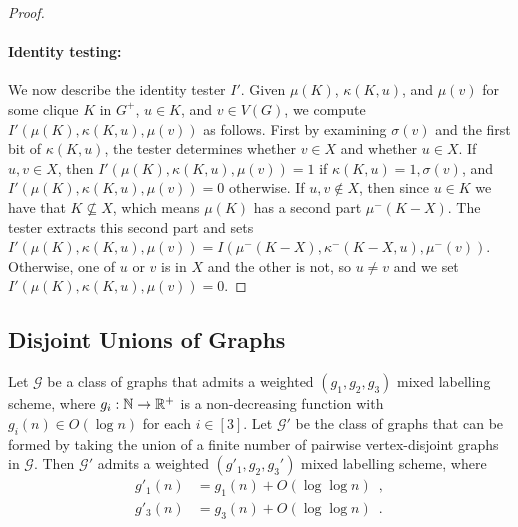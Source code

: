 \documentclass{patmorin}
\newcommand{\Oh}{O}
\begin{document}
\begin{proof}
  \paragraph{Identity testing:}
  We now describe the identity tester $I'$.
  Given $\mu(K)$, $\kappa(K,u)$, and $\mu(v)$ for some clique $K$ in $G^+$, $u\in K$, and $v\in V(G)$,
  we compute $I'(\mu(K),\kappa(K,u),\mu(v))$ as follows.
  First by examining $\sigma(v)$ and the first bit of $\kappa(K,u)$, the tester determines whether $v\in X$ and whether $u\in X$.
  If $u,v\in X$, then $I'(\mu(K),\kappa(K,u),\mu(v))=1$ if $\kappa(K,u)=1,\sigma(v)$, and $I'(\mu(K),\kappa(K,u),\mu(v))=0$ otherwise.
  If $u,v\not\in X$, then since $u\in K$ we have that $K\not\subseteq X$, which means $\mu(K)$ has a second part $\mu^-(K-X)$. The tester extracts this second part and sets
  $I'(\mu(K),\kappa(K,u),\mu(v)) = I(\mu^-(K-X),\kappa^-(K-X,u),\mu^-(v))$.
  Otherwise, one of $u$ or $v$ is in $X$ and the other is not, so $u\neq v$ and we set $I'(\mu(K),\kappa(K,u),\mu(v)) =0$.
  \qedhere
\end{proof}

\subsection{Disjoint Unions of Graphs}
\label{sec:disjoint}

\begin{lem}\label{disjoint_union_ii}
  Let $\mathcal{G}$ be a class of graphs that admits a weighted $(g_1,g_2,g_3)$ mixed labelling scheme, where $g_i:\mathbb{N}\to\mathbb{R}^+$ is a non-decreasing function  with $g_i(n)\in \Oh(\log n)$ for each $i\in[3]$. Let $\mathcal{G}'$ be the class of graphs that can be formed by taking the union of a finite number of pairwise vertex-disjoint graphs in $\mathcal{G}$.
  Then $\mathcal{G}'$ admits a weighted $(g'_1,g_2,g_3')$ mixed labelling scheme, where
  \begin{align*}
    g'_1(n)
     & = g_1(n)+\Oh(\log\log n)\enspace,   \\
    g'_3(n)
     & = g_3(n)+\Oh(\log\log n) \enspace .
  \end{align*}
\end{lem}
\end{document}

